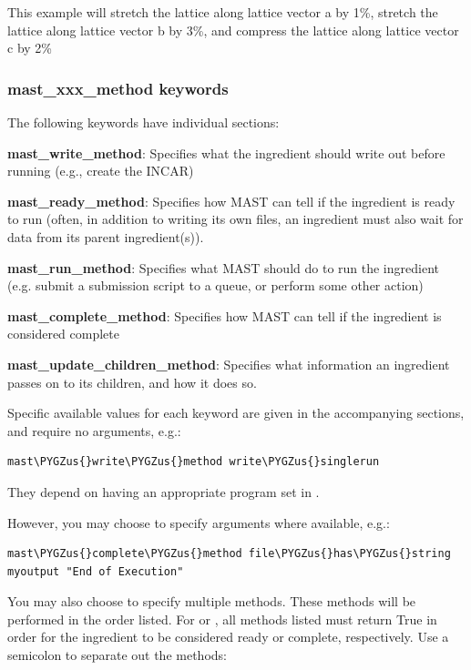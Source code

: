 \documentclass[letterpaper,10pt,english]{sphinxmanual}
\def\PYGZus{\char`\_}
\begin{document}
This example will stretch the lattice along lattice vector a by 1\%, stretch the lattice along lattice vector b by 3\%, and compress the lattice along lattice vector c by 2\%


\subsubsection{mast\_xxx\_method keywords}
\label{3_1_2_ingredients:mast-xxx-method-keywords}
The following keywords have individual sections:

\textbf{mast\_write\_method}: Specifies what the ingredient should write out before running (e.g., create the INCAR)

\textbf{mast\_ready\_method}: Specifies how MAST can tell if the ingredient is ready to run (often, in addition to writing its own files, an ingredient must also wait for data from its parent ingredient(s)).

\textbf{mast\_run\_method}: Specifies what MAST should do to run the ingredient (e.g. submit a submission script to a queue, or perform some other action)

\textbf{mast\_complete\_method}: Specifies how MAST can tell if the ingredient is considered complete

\textbf{mast\_update\_children\_method}: Specifies what information an ingredient passes on to its children, and how it does so.

Specific available values for each keyword are given in the accompanying sections, and require no arguments, e.g.:

\begin{Verbatim}[commandchars=\\\{\}]
mast\PYGZus{}write\PYGZus{}method write\PYGZus{}singlerun
\end{Verbatim}

They depend on having an appropriate program set in .

However, you may choose to specify arguments where available, e.g.:

\begin{Verbatim}[commandchars=\\\{\}]
mast\PYGZus{}complete\PYGZus{}method file\PYGZus{}has\PYGZus{}string myoutput "End of Execution"
\end{Verbatim}

You may also choose to specify multiple methods. These methods will be performed in the order listed. For  or , all methods listed must return True in order for the ingredient to be considered ready or complete, respectively.
Use a semicolon to separate out the methods:
\end{document}
